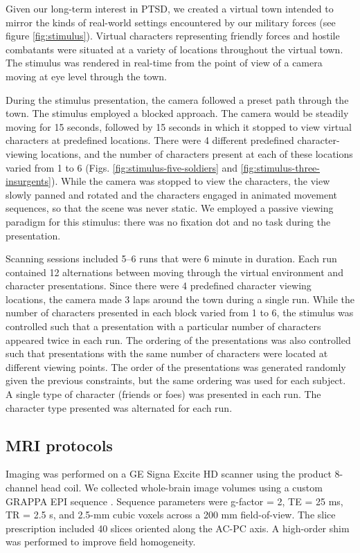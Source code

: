 \documentclass[preprint,5p,authoryear]{elsarticle}
\begin{document}
Given our long-term interest in PTSD, we created a virtual town intended to mirror the kinds of real-world settings encountered by our military forces (see figure \ref{fig:stimulus}).
Virtual characters representing friendly forces and hostile combatants were situated at a variety of locations throughout the virtual town.
The stimulus was rendered in real-time from the point of view of a camera moving at eye level through the town. 

During the stimulus presentation, the camera followed a preset path through the town.
The stimulus employed a blocked approach. The camera would be steadily moving for 15 seconds, followed by 15 seconds in which it stopped to view virtual characters at predefined locations.
There were 4 different predefined character-viewing locations, and the number of characters present at each of these locations varied from 1 to 6 (Figs. \ref{fig:stimulus-five-soldiers} and \ref{fig:stimulus-three-insurgents}).
While the camera was stopped to view the characters, the view slowly panned and rotated and the characters engaged in animated movement sequences, so that the scene was never static.
We employed a passive viewing paradigm for this stimulus: there was no fixation dot and no task during the presentation.

Scanning sessions included 5--6 runs that were 6 minute in duration.
Each run contained 12 alternations between moving through the virtual environment and character presentations. 
Since there were 4 predefined character viewing locations, the camera made 3 laps around the town during a single run.
While the number of characters presented in each block varied from 1 to 6, the stimulus was controlled such that a presentation with a particular number of characters appeared twice in each run.
The ordering of the presentations was also controlled such that presentations with the same number of characters were located at different viewing points.
The order of the presentations was generated randomly given the previous constraints, but the same ordering was used for each subject.
A single type of character (friends or foes) was presented in each run. 
The character type presented was alternated for each run.

\subsection{MRI protocols}
Imaging was performed on a GE Signa Excite HD scanner using the product 8-channel head coil.
We collected whole-brain image volumes using a custom GRAPPA EPI sequence \citep{Griswold2002}. 
Sequence parameters were g-factor = 2,  TE = 25 ms, TR = 2.5 s, and  2.5-mm cubic voxels across a 200 mm field-of-view. 
The slice prescription included 40 slices oriented along the AC-PC axis. 
A high-order shim was  performed to improve field homogeneity.
\end{document}
